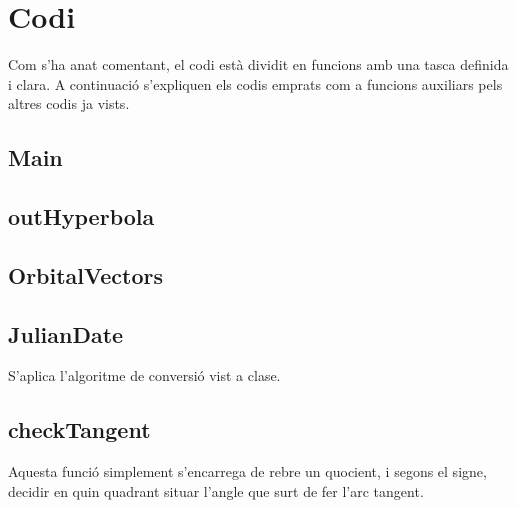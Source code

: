 \chapter{Codi}
Com s'ha anat comentant, el codi està dividit en funcions amb una tasca definida i clara. A continuació s'expliquen els codis emprats com a funcions auxiliars pels altres codis ja vists.
\section{Main}

% 
% 
\section{outHyperbola}
\label{outHyperbola}

\section{OrbitalVectors}
\label{OrbitalVectors}

\section{JulianDate}
S'aplica l'algoritme de conversió vist a clase. \cite[pàg.48]{Calaf2017a}

\section{checkTangent}
Aquesta funció simplement s'encarrega de rebre un quocient, i segons el signe, decidir en quin quadrant situar l'angle que surt de fer l'arc tangent.

